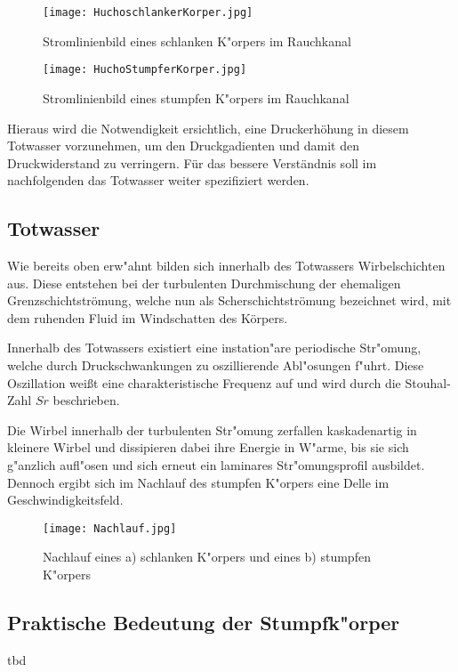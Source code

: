 \begin{figure}[h]
	\centering
	\texttt{[image: HuchoschlankerKorper.jpg]}
	\caption{Stromlinienbild eines schlanken K"orpers im Rauchkanal \cite{Hucho.2011}}
	\label{fig:HuchoSchlank}
\end{figure}

\begin{figure}[h]
	\centering
	\texttt{[image: HuchoStumpferKorper.jpg]}
	\caption{Stromlinienbild eines stumpfen K"orpers im Rauchkanal \cite{Hucho.2011}}
	\label{fig:HuchoStumpf}
\end{figure}


Hieraus wird die Notwendigkeit ersichtlich, eine Druckerhöhung in diesem Totwasser vorzunehmen, um den Druckgadienten und damit den Druckwiderstand zu verringern. Für das bessere Verständnis soll im nachfolgenden das Totwasser weiter spezifiziert werden.

\subsection{Totwasser}
\label{sec:Totwasser}

Wie bereits oben erw"ahnt bilden sich innerhalb des Totwassers Wirbelschichten aus. Diese entstehen bei der turbulenten Durchmischung der ehemaligen Grenzschichtströmung, welche nun als Scherschichtströmung bezeichnet wird, mit dem ruhenden Fluid im Windschatten des Körpers. 



 
Innerhalb des Totwassers existiert eine instation"are periodische Str"omung, welche durch Druckschwankungen zu oszillierende Abl"osungen f"uhrt. Diese Oszillation wei\ss{}t eine charakteristische Frequenz auf und wird durch die Stouhal-Zahl ${Sr}$ beschrieben. 

Die Wirbel innerhalb der turbulenten Str"omung  zerfallen kaskadenartig in kleinere Wirbel und dissipieren dabei ihre Energie in W"arme, bis sie sich g"anzlich aufl"osen und sich erneut ein laminares Str"omungsprofil ausbildet. Dennoch ergibt sich im Nachlauf des stumpfen K"orpers eine Delle im Geschwindigkeitsfeld. 

\begin{figure}[h]
	\centering
	\texttt{[image: Nachlauf.jpg]}
	\caption{Nachlauf eines a) schlanken K"orpers und eines b) stumpfen K"orpers \cite{Hucho.2011}}
	\label{fig:Nachlauf}
\end{figure}

\subsection{Praktische Bedeutung der Stumpfk"orper}
tbd





